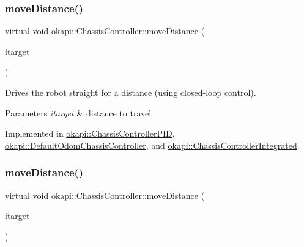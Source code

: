 \subsubsection{\texorpdfstring{moveDistance()}{moveDistance()}\hspace{0.1cm}{\footnotesize\ttfamily [1/2]}}
{\footnotesize\ttfamily virtual void okapi\+::\+Chassis\+Controller\+::move\+Distance (\begin{DoxyParamCaption}\item[{Q\+Length}]{itarget }\end{DoxyParamCaption})\hspace{0.3cm}{\ttfamily [pure virtual]}}

Drives the robot straight for a distance (using closed-\/loop control).


\begin{DoxyParams}{Parameters}
{\em itarget} & distance to travel \\
\hline
\end{DoxyParams}


Implemented in \mbox{\hyperlink{classokapi_1_1ChassisControllerPID_ab5f0409c6add9b1c3b176b61643de067}{okapi\+::\+Chassis\+Controller\+P\+ID}}, \mbox{\hyperlink{classokapi_1_1DefaultOdomChassisController_a3143bc60f72ab8ff8f63aad9a810a1c6}{okapi\+::\+Default\+Odom\+Chassis\+Controller}}, and \mbox{\hyperlink{classokapi_1_1ChassisControllerIntegrated_aa9af3fb56afdb940f92bd8016ef63925}{okapi\+::\+Chassis\+Controller\+Integrated}}.

\mbox{\label{classokapi_1_1ChassisController_a58619e777fd1b3f8e1aae871d46a8ccf}} 
\subsubsection{\texorpdfstring{moveDistance()}{moveDistance()}\hspace{0.1cm}{\footnotesize\ttfamily [2/2]}}
{\footnotesize\ttfamily virtual void okapi\+::\+Chassis\+Controller\+::move\+Distance (\begin{DoxyParamCaption}\item[{double}]{itarget }\end{DoxyParamCaption})\hspace{0.3cm}{\ttfamily [pure virtual]}}

